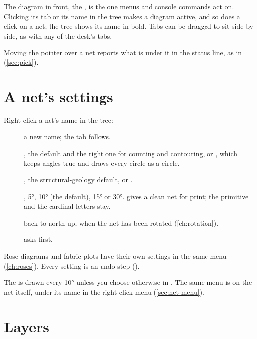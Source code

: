 The diagram in front, the , is the one menus and console commands act on. Clicking
its tab or its name in the tree makes a diagram active, and so does a click on a net; the tree shows its
name in bold. Tabs can be dragged to sit side by side, as with any of the desk's tabs.

Moving the pointer over a net reports what is under it in the status line, as in  (\cref{sec:pick}).

\section{A net's settings}\label{sec:net-settings}


Right-click a net's name in the tree:

\begin{description}
\item[] a new name; the tab follows.
\item[] , the default and the right one for counting and
contouring, or , which keeps angles true and draws every circle as a circle.
\item[] , the structural-geology default, or .
\item[] , 5°, 10° (the default), 15° or 30°.  gives a clean net for
print; the primitive and the cardinal letters stay.
\item[] back to north up, when the net has been rotated (\cref{ch:rotation}).
\item[] asks first. 
\end{description}

Rose diagrams and fabric plots have their own settings in the same menu (\cref{ch:roses}). Every setting
is an undo step ().

The  is drawn every 10° unless you choose otherwise in . The same menu is
on the net itself, under its name in the right-click menu (\cref{sec:net-menu}).

\section{Layers}\label{sec:layers}


